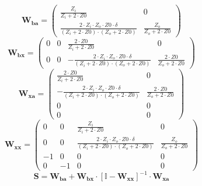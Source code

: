 \[ \mathbf{W_{ba}} = \left(\begin{smallmatrix} \frac{Z_i}{Z_i+2\cdot
Z0} & 0 \\ \frac{2\cdot Z_i\cdot Z_o\cdot Z0\cdot
\delta}{\left(Z_i+2\cdot Z0\right)\cdot\left(Z_o+2\cdot Z0\right)} &
\frac{Z_o}{Z_o+2\cdot Z0} \end{smallmatrix}\right) \]
\[ \mathbf{W_{bx}} = \left(\begin{smallmatrix} 0 & 0 & \frac{2\cdot
Z0}{Z_i+2\cdot Z0} & 0 \\ 0 & 0 & -\frac{2\cdot Z_i\cdot Z_o\cdot
Z0\cdot \delta}{\left(Z_i+2\cdot Z0\right)\cdot\left(Z_o+2\cdot
Z0\right)} & \frac{2\cdot Z0}{Z_o+2\cdot Z0} \end{smallmatrix}\right)
\]
\[ \mathbf{W_{xa}} = \left(\begin{smallmatrix} \frac{2\cdot
Z0}{Z_i+2\cdot Z0} & 0 \\ -\frac{2\cdot Z_i\cdot Z_o\cdot Z0\cdot
\delta}{\left(Z_i+2\cdot Z0\right)\cdot\left(Z_o+2\cdot Z0\right)} &
\frac{2\cdot Z0}{Z_o+2\cdot Z0} \\ 0 & 0 \\ 0 & 0
\end{smallmatrix}\right) \]
\[ \mathbf{W_{xx}} = \left(\begin{smallmatrix} 0 & 0 &
\frac{Z_i}{Z_i+2\cdot Z0} & 0 \\ 0 & 0 & \frac{2\cdot Z_i\cdot
Z_o\cdot Z0\cdot \delta}{\left(Z_i+2\cdot
Z0\right)\cdot\left(Z_o+2\cdot Z0\right)} & \frac{Z_o}{Z_o+2\cdot Z0}
\\ -1 & 0 & 0 & 0 \\ 0 & -1 & 0 & 0 \end{smallmatrix}\right) \]
\[ \mathbf{S}=\mathbf{W_{ba}}+\mathbf{W_{bx}}\cdot\left[ \mathbb{I}
-\mathbf{W_{xx}}\right]^{-1}\cdot\mathbf{W_{xa}} \]
